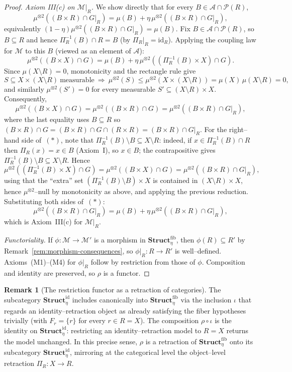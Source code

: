 \documentclass[11pt]{article}
\numberwithin{equation}{section}
\theoremstyle{definition}
\newtheorem{remark}[theorem]{Remark}
\begin{document}
\begin{proof}
\emph{Axiom III(c) on $\mathcal M|_R$.} We show directly that for every $B\in\mathcal A\cap\mathcal P(R)$,
\[
\mu^{\otimes2}((B\times R)\cap G|_R)=\mu(B)+\eta\,\mu^{\otimes2}((B\times R)\cap G|_R),
\]
equivalently $(1-\eta)\mu^{\otimes2}((B\times R)\cap G|_R)=\mu(B)$. Fix $B\in\mathcal A\cap\mathcal P(R)$, so $B\subseteq R$ and hence $\Pi_R^{-1}(B)\cap R=B$ (by $\Pi_R|_R=\mathrm{id}_R$). Applying the coupling law for $\mathcal M$ to this $B$ (viewed as an element of $\mathcal A$):
\[
\mu^{\otimes2}((B\times X)\cap G)=\mu(B)+\eta\,\mu^{\otimes2}((\Pi_R^{-1}(B)\times X)\cap G). \tag{$\ast$}
\]
Since $\mu(X\setminus R)=0$, monotonicity and the rectangle rule give
\[
S\subseteq X\times(X\setminus R)\ \text{measurable}\ \Longrightarrow\ \mu^{\otimes2}(S)\le\mu^{\otimes2}(X\times(X\setminus R))=\mu(X)\,\mu(X\setminus R)=0,
\]
and similarly $\mu^{\otimes2}(S')=0$ for every measurable $S'\subseteq(X\setminus R)\times X$. Consequently,
\[
\mu^{\otimes2}((B\times X)\cap G)=\mu^{\otimes2}((B\times R)\cap G)=\mu^{\otimes2}((B\times R)\cap G|_R),
\]
where the last equality uses $B\subseteq R$ so $(B\times R)\cap G=(B\times R)\cap G\cap(R\times R)=(B\times R)\cap G|_R$. For the right--hand side of~$(\ast)$, note that $\Pi_R^{-1}(B)\setminus B\subseteq X\setminus R$: indeed, if $x\in\Pi_R^{-1}(B)\cap R$ then $\Pi_R(x)=x\in B$ (Axiom~I), so $x\in B$; the contrapositive gives $\Pi_R^{-1}(B)\setminus B\subseteq X\setminus R$. Hence
\[
\mu^{\otimes2}((\Pi_R^{-1}(B)\times X)\cap G)=\mu^{\otimes2}((B\times X)\cap G)=\mu^{\otimes2}((B\times R)\cap G|_R),
\]
using that the ``extra'' set $(\Pi_R^{-1}(B)\setminus B)\times X$ is contained in $(X\setminus R)\times X$, hence $\mu^{\otimes2}$--null by monotonicity as above, and applying the previous reduction. Substituting both sides of~$(\ast)$:
\[
\mu^{\otimes2}((B\times R)\cap G|_R)=\mu(B)+\eta\,\mu^{\otimes2}((B\times R)\cap G|_R),
\]
which is Axiom~III(c) for $\mathcal M|_R$.

\emph{Functoriality.} If $\phi:\mathcal M\to\mathcal M'$ is a morphism in $\mathbf{Struct}_{\eta}^{\mathrm{fib}}$, then $\phi(R)\subseteq R'$ by Remark~\ref{rem:morphism-consequences}, so $\phi|_R:R\to R'$ is well--defined. Axioms~(M1)--(M4) for $\phi|_R$ follow by restriction from those of $\phi$. Composition and identity are preserved, so $\rho$ is a functor.
\end{proof}

\begin{remark}[The restriction functor as a retraction of categories]\label{rem:restriction-retraction}
The subcategory $\mathbf{Struct}^{\mathrm{id}}_{\eta}$ includes canonically into $\mathbf{Struct}_{\eta}^{\mathrm{fib}}$ via the inclusion $\iota$ that regards an identity--retraction object as already satisfying the fiber hypotheses trivially (with $F_r=\{r\}$ for every $r\in R=X$). The composition $\rho\circ\iota$ is the identity on $\mathbf{Struct}^{\mathrm{id}}_{\eta}$: restricting an identity--retraction model to $R=X$ returns the model unchanged. In this precise sense, $\rho$ is a retraction of $\mathbf{Struct}_{\eta}^{\mathrm{fib}}$ onto its subcategory $\mathbf{Struct}^{\mathrm{id}}_{\eta}$, mirroring at the categorical level the object--level retraction $\Pi_R:X\to R$.
\end{remark}
\end{document}
